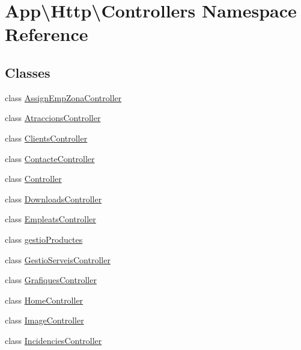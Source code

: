 \hypertarget{namespace_app_1_1_http_1_1_controllers}{}\section{App\textbackslash{}Http\textbackslash{}Controllers Namespace Reference}
\label{namespace_app_1_1_http_1_1_controllers}
\subsection*{Classes}
\begin{DoxyCompactItemize}
\item 
class \mbox{\hyperlink{class_app_1_1_http_1_1_controllers_1_1_assign_emp_zona_controller}{Assign\+Emp\+Zona\+Controller}}
\item 
class \mbox{\hyperlink{class_app_1_1_http_1_1_controllers_1_1_atraccions_controller}{Atraccions\+Controller}}
\item 
class \mbox{\hyperlink{class_app_1_1_http_1_1_controllers_1_1_clients_controller}{Clients\+Controller}}
\item 
class \mbox{\hyperlink{class_app_1_1_http_1_1_controllers_1_1_contacte_controller}{Contacte\+Controller}}
\item 
class \mbox{\hyperlink{class_app_1_1_http_1_1_controllers_1_1_controller}{Controller}}
\item 
class \mbox{\hyperlink{class_app_1_1_http_1_1_controllers_1_1_downloads_controller}{Downloads\+Controller}}
\item 
class \mbox{\hyperlink{class_app_1_1_http_1_1_controllers_1_1_empleats_controller}{Empleats\+Controller}}
\item 
class \mbox{\hyperlink{class_app_1_1_http_1_1_controllers_1_1gestio_productes}{gestio\+Productes}}
\item 
class \mbox{\hyperlink{class_app_1_1_http_1_1_controllers_1_1_gestio_serveis_controller}{Gestio\+Serveis\+Controller}}
\item 
class \mbox{\hyperlink{class_app_1_1_http_1_1_controllers_1_1_grafiques_controller}{Grafiques\+Controller}}
\item 
class \mbox{\hyperlink{class_app_1_1_http_1_1_controllers_1_1_home_controller}{Home\+Controller}}
\item 
class \mbox{\hyperlink{class_app_1_1_http_1_1_controllers_1_1_image_controller}{Image\+Controller}}
\item 
class \mbox{\hyperlink{class_app_1_1_http_1_1_controllers_1_1_incidencies_controller}{Incidencies\+Controller}}

\end{DoxyCompactItemize}
